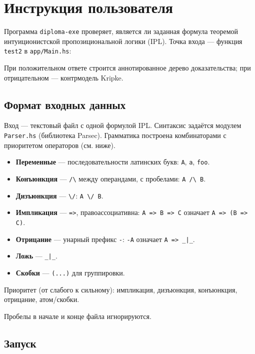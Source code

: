 \documentclass[a4paper,12pt]{article}
\newenvironment{listingcenter}{%
  \begin{center}\begin{minipage}{\linewidth}%
}{%
  \end{minipage}\end{center}%
}
\newcommand{\hssnippet}[2]{%
  \begin{listingcenter}%
  \end{listingcenter}}
\begin{document}
\tableofcontents
\newpage

\section{Инструкция пользователя}

Программа \texttt{diploma-exe} проверяет, является ли заданная формула
теоремой интуиционистской пропозициональной логики (IPL). Точка входа ---
функция \texttt{test2} в \texttt{app/Main.hs}:
\hssnippet{main-pipeline.hs}{Точка входа: \texttt{test2} в \texttt{app/Main.hs}}

При положительном ответе строится аннотированное дерево доказательства;
при отрицательном --- контрмодель Kripke.

\subsection{Формат входных данных}

Вход --- текстовый файл с одной формулой IPL. Синтаксис задаётся модулем
\texttt{Parser.hs} (библиотека Parsec). Грамматика построена комбинаторами
с приоритетом операторов (см. ниже).
\hssnippet{parser-grammar.hs}{Грамматика парсера формул (\texttt{Parser.hs})}

\begin{itemize}
  \item \textbf{Переменные} --- последовательности латинских букв:
        \texttt{A}, \texttt{a}, \texttt{foo}.
  \item \textbf{Конъюнкция} --- \verb|/\| между операндами, с пробелами:
        \verb|A /\ B|.
  \item \textbf{Дизъюнкция} --- \verb|\/|: \verb|A \/ B|.
  \item \textbf{Импликация} --- \verb|=>|, правоассоциативна:
        \verb|A => B => C| означает \verb|A => (B => C)|.
  \item \textbf{Отрицание} --- унарный префикс \verb+-+:
        \verb+-A+ означает \verb+A => _|_+.
  \item \textbf{Ложь} --- \verb+_|_+.
  \item \textbf{Скобки} --- \verb|(...)| для группировки.
\end{itemize}

Приоритет (от слабого к сильному): импликация, дизъюнкция, конъюнкция,
отрицание, атом/скобки.

Пробелы в начале и конце файла игнорируются.

\subsection{Запуск}
\end{document}

